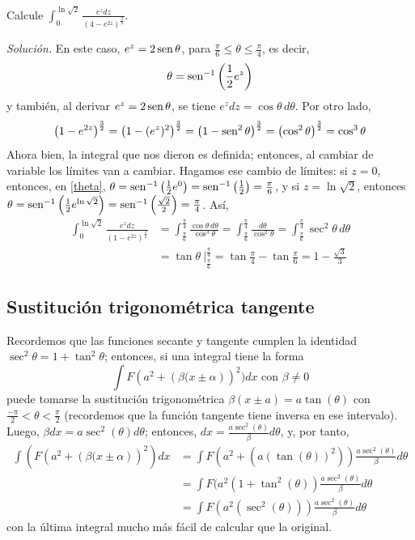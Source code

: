 \begin{ejemplo}
Calcule $\int_{0}^{\ln \sqrt{2}}\frac{e^{z}dz}{\left( 4-e^{2z}\right) ^{\frac{3}{2}}}$.
\end{ejemplo}

\emph{Solución.} En este caso, $e^{z}=2\operatorname{sen}\theta$, para $\frac{\pi }{6}\leq \theta \leq \frac{\pi }{4}$, es decir,
\begin{equation}\label{theta}
\theta=\operatorname{sen}^{-1}\left(\frac{1}{2}e^{z}\right)
\end{equation}
y también, al derivar $e^z=2\operatorname{sen}\theta$, se tiene $e^{z}dz=\cos \theta\,d\theta$. Por otro lado,
\[
\left( 1-e^{2z}\right)^{\frac{3}{2}}=\left( 1-(e^{z})^2\right)^{\frac{3}{2}}=\left( 1-\operatorname{sen}^{2}\theta \right) ^{\frac{3}{2}}=\left( \cos^{2}\theta \right) ^{\frac{3}{2}}=\cos ^{3}\theta \]
Ahora bien, la integral que nos dieron es definida; entonces, al cambiar de variable los límites van a cambiar. Hagamos ese cambio de límites: si $z=0$, entonces, en \eqref{theta}, $\theta =\operatorname{sen}^{-1} \left( \frac{1}{2}e^0\right)=\operatorname{sen}^{-1} \left( \frac{1}{2}\right)=\frac{\pi }{6}$, y si $z=\ln \sqrt{2}$, entonces $\theta=\operatorname{sen}^{-1} \left(\frac{1}{2}e^{\ln\sqrt{2}}\right) =\operatorname{sen}^{-1} \left(\frac{\sqrt{2}}{2}\right) =\frac{\pi }{4}$. Así,
\begin{align*}
\int_{0}^{\ln \sqrt{2}}\frac{e^{z}dz}{\left( 1-e^{2z}\right) ^{\frac{3}{2}}}&=\int_{\frac{\pi }{6}}^{\frac{\pi }{4}}\frac{\cos \theta\,d\theta }{\cos^{3}\theta }=\int_{\frac{\pi }{6}}^{\frac{\pi }{4}}\frac{d\theta }{\cos^{2}\theta } =\int_{\frac{\pi }{6}}^{\frac{\pi }{4}}\sec ^{2}\theta\,d\theta
\\
&= \tan \theta\ \Big|_{\frac{\pi }{6}}^{\frac{\pi }{4}}=\tan \frac{\pi }{4}-\tan \frac{\pi }{6}=1-\frac{\sqrt{3}}{3}
\end{align*}

\subsection{Sustitución trigonométrica tangente}

Recordemos que las funciones secante y tangente cumplen la identidad $\sec^2\theta=1+\tan^2\theta$; entonces, si una integral tiene la forma
\[
\int F(a^{2}+\left( \beta (x\pm \alpha \right) )^{2})dx\text{ con } \beta \neq 0
\]
puede tomarse la sustitución trigonométrica $\beta (x\pm a)=a\tan
(\theta )$ con $\frac{-\pi }{2}<\theta <\frac{\pi }{2}$ (recordemos que la
función tangente tiene inversa en ese intervalo). Luego, $\beta dx=a\sec ^{2}(\theta)d\theta$; entonces, $dx=\frac{a\sec ^{2}(\theta )}{\beta}d\theta $, y, por tanto,
\begin{align*}
\int (F(a^{2}+\left( \beta (x\pm \alpha \right) )^{2})dx &= \int
  F(a^{2}+(a(\tan (\theta ))^{2}))\frac{a\sec ^{2}(\theta )}{\beta }d\theta \\
  &= \int F(a^{2}(1+\tan ^{2}(\theta ))\frac{a\sec ^{2}(\theta )}{\beta }%
    d\theta \\
    &= \int F(a^{2}(\sec ^{2}(\theta )))\frac{a\sec ^{2}(\theta )}{\beta }%
    d\theta
  \end{align*}
  con la última integral mucho más fácil de calcular que la original.

